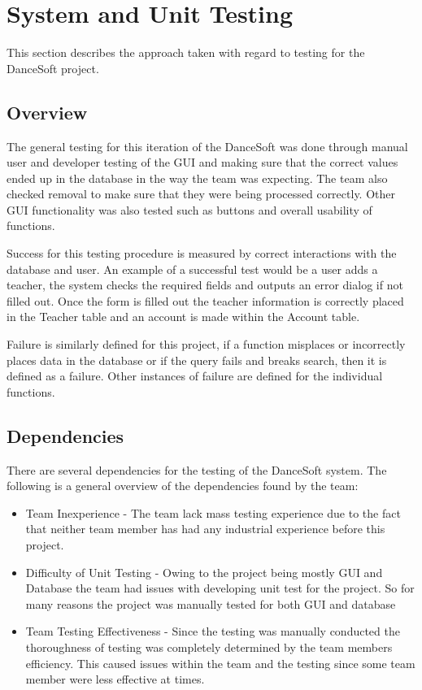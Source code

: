 

\chapter{System  and Unit Testing}

This section describes the approach taken with regard to testing for the DanceSoft project. 

\section{Overview}
The general testing for this iteration of the DanceSoft was done through manual user and developer testing of the GUI and making sure that the correct values ended up in the database in the way the team was expecting. The team also checked removal to make sure that they were being processed correctly. Other GUI functionality was also tested such as buttons and overall usability of functions.

Success for this testing procedure is measured by correct interactions with the database and user. An example of a successful test would be a user adds a teacher, the system checks the required fields and outputs an error dialog if not filled out. Once the form is filled out the teacher information is correctly placed in the Teacher table and an account is made within the Account table.

Failure is similarly defined for this project, if a function misplaces or incorrectly places data in the database or if the query fails and breaks search, then it is defined as a failure. Other instances of failure are defined for the individual functions.

\section{Dependencies}
There are several dependencies for the testing of the DanceSoft system. The following is a general overview of the dependencies found by the team:

\begin{itemize}
\item Team Inexperience - The team lack mass testing experience due to the fact that neither team member has had any industrial experience before this project.
\item Difficulty of Unit Testing - Owing to the project being mostly GUI and Database the team had issues with developing unit test for the project. So for many reasons the project was manually tested for both GUI and database
\item Team Testing Effectiveness - Since the testing was manually conducted the thoroughness of testing was completely determined by the team members efficiency. This caused issues within the team and the testing since some team member were less effective at times.  
\end{itemize} 


